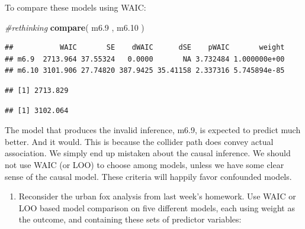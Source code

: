 \documentclass[
]{article}
\newenvironment{Shaded}{\begin{snugshade}}{\end{snugshade}}
\newcommand{\CommentTok}[1]{\textcolor[rgb]{0.56,0.35,0.01}{\textit{#1}}}
\newcommand{\FloatTok}[1]{\textcolor[rgb]{0.00,0.00,0.81}{#1}}
\newcommand{\KeywordTok}[1]{\textcolor[rgb]{0.13,0.29,0.53}{\textbf{#1}}}
\newcommand{\NormalTok}[1]{#1}
\newcommand{\OperatorTok}[1]{\textcolor[rgb]{0.81,0.36,0.00}{\textbf{#1}}}
\providecommand{\tightlist}{%
  \setlength{\itemsep}{0pt}\setlength{\parskip}{0pt}}
\begin{document}
To compare these models using WAIC:

\begin{Shaded}
\begin{Highlighting}[]
\CommentTok{#rethinking}
 \KeywordTok{compare}\NormalTok{( m6}\FloatTok{.9}\NormalTok{ , m6}\FloatTok{.10}\NormalTok{ )}
\end{Highlighting}
\end{Shaded}

\begin{verbatim}
##           WAIC       SE    dWAIC      dSE    pWAIC       weight
## m6.9  2713.964 37.55324   0.0000       NA 3.732484 1.000000e+00
## m6.10 3101.906 27.74820 387.9425 35.41158 2.337316 5.745894e-85
\end{verbatim}

\begin{Shaded}
\end{Shaded}

\begin{verbatim}
## [1] 2713.829
\end{verbatim}

\begin{Shaded}
\end{Shaded}

\begin{verbatim}
## [1] 3102.064
\end{verbatim}

The model that produces the invalid inference, m6.9, is expected to
predict much better. And it would. This is because the collider path
does convey actual association. We simply end up mistaken about the
causal inference. We should not use WAIC (or LOO) to choose among
models, unless we have some clear sense of the causal model. These
criteria will happily favor confounded models.

\begin{enumerate}
\def\labelenumi{\arabic{enumi}.}
\setcounter{enumi}{2}
\tightlist
\item
  Reconsider the urban fox analysis from last week's homework. Use WAIC
  or LOO based model comparison on five different models, each using
  weight as the outcome, and containing these sets of predictor
  variables:
\end{enumerate}
\end{document}

